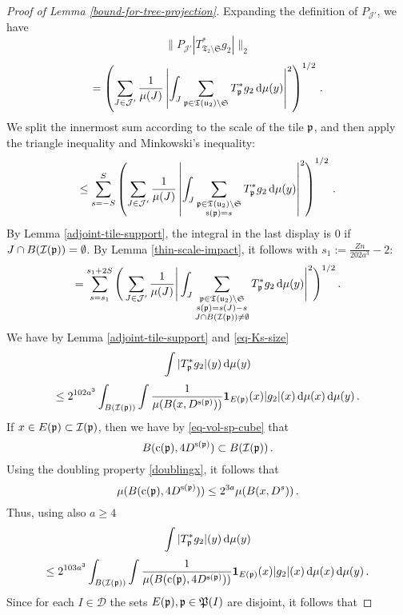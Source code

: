 {\begin{proof}[Proof of Lemma \ref{bound-for-tree-projection}]
    Expanding the definition of $P_{\mathcal{J}'}$, we have
    $$
        \|P_{\mathcal{J}'}|T_{\mathfrak{T}_2 \setminus \mathfrak{S}}^* g_2|\|_2
    $$
    $$
        = \left(\sum_{J \in \mathcal{J}'} \frac{1}{\mu(J)} \left|\int_J \sum_{{\mathfrak p} \in {\mathfrak T}({\mathfrak u}_2) \setminus \mathfrak{S}} T_{{\mathfrak p}}^* g_2 \, \mathrm{d}\mu(y) \right|^2 \right)^{1/2}\,.
    $$
    We split the innermost sum according to the scale of the tile ${\mathfrak p}$, and then apply the triangle inequality and Minkowski's inequality:
    $$
        \le \sum_{s = -S}^S \left( \sum_{J \in \mathcal{J}'} \frac{1}{\mu(J)} \left|\int_J \sum_{\substack{{\mathfrak p} \in {\mathfrak T}({\mathfrak u}_2) \setminus \mathfrak{S}\\ {\mathrm{s}}({\mathfrak p}) = s}} T_{{\mathfrak p}}^* g_2 \, \mathrm{d}\mu(y) \right|^2\right)^{1/2}\,.
    $$
    By Lemma \ref{adjoint-tile-support}, the integral in the last display is $0$ if $J \cap B({\mathcal{I}}({\mathfrak p})) = \emptyset$. By Lemma \ref{thin-scale-impact}, it follows with $s_1 := \frac{Zn}{202a^3} - 2$:
    \begin{equation}
    \label{eq-sep-tree-small-1}
        = \sum_{s = s_1}^{s_1 + 2S} \Bigg( \sum_{J \in \mathcal{J}'} \frac{1}{\mu(J)} \Bigg|\int_J \sum_{\substack{{\mathfrak p} \in {\mathfrak T}({\mathfrak u}_2) \setminus \mathfrak{S}\\ {\mathrm{s}}({\mathfrak p}) = s(J) - s\\
        J \cap B({\mathcal{I}}({\mathfrak p})) \ne \emptyset}} T_{{\mathfrak p}}^* g_2 \, \mathrm{d}\mu(y) \Bigg|^2\Bigg)^{1/2}\,.
    \end{equation}
    We have by Lemma \ref{adjoint-tile-support} and \eqref{eq-Ks-size}
    $$
        \int |T_{{\mathfrak p}}^* g_2|(y) \, \mathrm{d}\mu(y)
    $$
    $$
        \le 2^{102a^3} \int_{B({\mathcal{I}}({\mathfrak p}))} \int \frac{1}{\mu(B(x, D^{{\mathrm{s}}({\mathfrak p})}))} \mathbf{1}_{E({\mathfrak p})}(x) |g_2|(x) \, \mathrm{d}\mu(x) \, \mathrm{d}\mu(y)\,.
    $$
    If $x \in E({\mathfrak p}) \subset {\mathcal{I}}({\mathfrak p})$, then we have by \eqref{eq-vol-sp-cube} that
    $$
        B({\mathrm{c}}({\mathfrak p}), 4D^{{\mathrm{s}}({\mathfrak p})}) \subset B({\mathcal{I}}({\mathfrak p}))\,.
    $$
    Using the doubling property \eqref{doublingx}, it follows that
    $$
        \mu(B({\mathrm{c}}({\mathfrak p}), 4D^{{\mathrm{s}}({\mathfrak p})})) \le 2^{3a} \mu(B(x, D^s))\,.
    $$
    Thus, using also $a \ge 4$
    $$
        \int |T_{{\mathfrak p}}^* g_2|(y) \, \mathrm{d}\mu(y)
    $$
    $$
        \le 2^{103 a^3} \int_{B({\mathcal{I}}({\mathfrak p}))} \int \frac{1}{\mu(B({\mathrm{c}}({\mathfrak p}), 4D^{{\mathrm{s}}({\mathfrak p})}))} \mathbf{1}_{E({\mathfrak p})}(x) |g_2|(x) \, \mathrm{d}\mu(x) \, \mathrm{d}\mu(y)\,.
    $$
    Since for each $I \in \mathcal{D}$ the sets $E({\mathfrak p}), {\mathfrak p} \in {\mathfrak P}(I)$ are disjoint, it follows that

\end{proof}}
